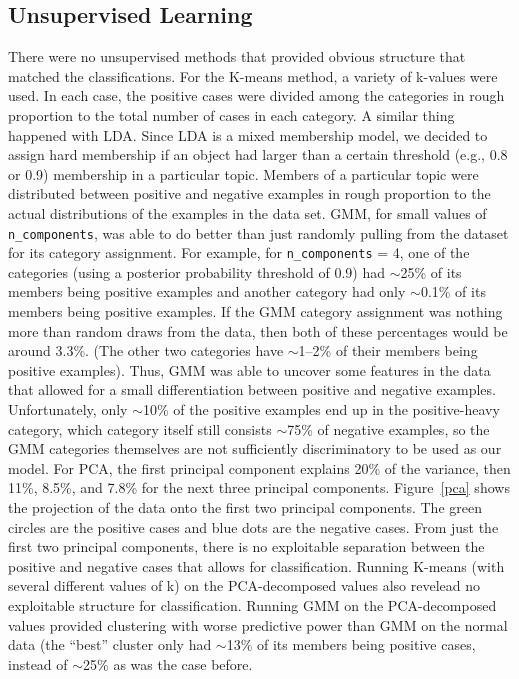 \subsection{Unsupervised Learning}
There were no unsupervised methods that provided obvious structure  that matched the classifications.  For the K-means method, a variety of k-values were used.  In each case, the positive cases were divided among the categories in rough proportion to the total number of cases in each category.  A similar thing happened with LDA.  Since LDA is a mixed membership model, we decided to assign hard membership if an object had larger than a certain threshold (e.g., 0.8 or 0.9) membership in a particular topic.  Members of a particular topic were distributed between positive and negative examples in rough proportion to the actual distributions of the examples in the data set.  GMM, for small values of \texttt{n\_components}, was able to do better than just randomly pulling from the dataset for its category assignment.  For example, for \texttt{n\_components} = 4, one of the categories (using a posterior probability threshold of 0.9) had ${\sim}$25\% of its members being positive examples and another category had only ${\sim}$0.1\% of its members being positive examples.  If the GMM category assignment was nothing more than random draws from the data, then both of these percentages would be around 3.3\%.  (The other two categories have ${\sim}$1--2\% of their members being positive examples).  Thus, GMM was able to uncover some features in the data that allowed for a small differentiation between positive and negative examples.  Unfortunately, only ${\sim}$10\% of the positive examples end up in the positive-heavy category, which category itself still consists ${\sim}$75\% of negative examples, so the GMM categories themselves are not sufficiently discriminatory to be used as our model.
For PCA, the first principal component explains 20\% of the variance, then 11\%, 8.5\%, and 7.8\% for the next three principal components.  Figure~\ref{pca} shows the projection of the data onto the first two principal components.  The green circles are the positive cases and blue dots are the negative cases.  From just the first two principal components, there is no exploitable separation between the positive and negative cases that allows for classification.  Running K-means (with several different values of k) on the PCA-decomposed values also revelead no exploitable structure for classification.  Running GMM on the PCA-decomposed values provided clustering with worse predictive power than GMM on the normal data (the ``best'' cluster only had ${\sim}$13\% of its members being positive cases, instead of ${\sim}$25\% as was the case before.
